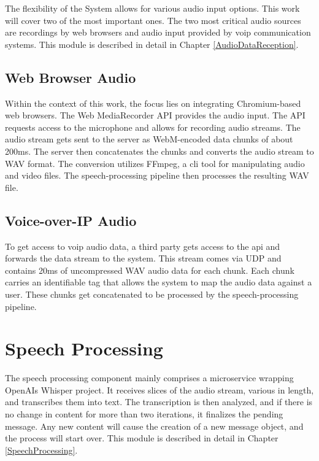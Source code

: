 The flexibility of the System allows for various audio input options. This work will cover two of the most important 
ones. The two most critical audio sources are recordings by web browsers and audio input provided by \ac{voip} 
communication systems. This module is described in detail in Chapter \ref{AudioDataReception}.

\subsection{Web Browser Audio}

Within the context of this work, the focus lies on integrating Chromium-based web browsers. The Web MediaRecorder API 
provides the audio input. The API requests access to the microphone and allows for recording audio streams. 
The audio stream gets sent to the server as WebM-encoded data chunks of about 200ms. The server then concatenates the 
chunks and converts the audio stream to WAV format. The conversion utilizes FFmpeg, a \ac{cli} tool for 
manipulating audio and video files. The speech-processing pipeline then processes the resulting WAV file.

\subsection{Voice-over-IP Audio}

To get access to \ac{voip} audio data, a third party gets access to the \ac{api} and forwards the data stream to the 
system. This stream comes via UDP and contains 20ms of uncompressed WAV audio data for each chunk.
Each chunk carries an identifiable tag that allows the system to map the audio data against a user.
These chunks get concatenated to be processed by the speech-processing pipeline.


\section{Speech Processing}

The speech processing component mainly comprises a microservice wrapping OpenAIs Whisper project. It receives slices of 
the audio stream, various in length, and transcribes them into text. The transcription is then analyzed, and if there 
is no change in content for more than two iterations, it finalizes the pending message. Any new content will cause the 
creation of a new message object, and the process will start over. This module is described in detail in Chapter 
\ref{SpeechProcessing}.

